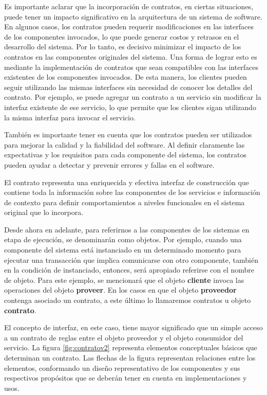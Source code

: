 Es importante aclarar que la incorporación de contratos, en ciertas situaciones, puede tener un impacto significativo en la arquitectura de un sistema de software. En algunos casos, los contratos pueden requerir modificaciones en las interfaces de los componentes invocados, lo que puede generar costos y retrasos en el desarrollo del sistema. Por lo tanto, es decisivo minimizar el impacto de los contratos en las componentes originales del sistema. Una forma de lograr esto es mediante la implementación de contratos que sean compatibles con las interfaces existentes de los componentes invocados. De esta manera, los clientes pueden seguir utilizando las mismas interfaces sin necesidad de conocer los detalles del contrato. Por ejemplo, se puede agregar un contrato a un servicio sin modificar la interfaz existente de ese servicio, lo que permite que los clientes sigan utilizando la misma interfaz para invocar el servicio.

También es importante tener en cuenta que los contratos pueden ser utilizados para mejorar la calidad y la fiabilidad del software. Al definir claramente las expectativas y los requisitos para cada componente del sistema, los contratos pueden ayudar a detectar y prevenir errores y fallas en el software.

El contrato representa una enriquecida y efectiva interfaz de construcción que contiene toda la información sobre las componentes de los servicios e información de contexto para definir comportamientos a niveles funcionales en el sistema original que lo incorpora.

Desde ahora en adelante, para referirnos a las componentes de los sistemas en etapa de ejecución, se denominarán como objetos. Por ejemplo, cuando una componente del sistema está instanciado en un determinado momento para ejecutar una transacción que implica comunicarse con otro componente, también en la condición de instanciado, entonces, será apropiado referirse con el nombre de objeto. Para este ejemplo, se mencionará que el objeto \textbf{cliente} invoca las operaciones del objeto \textbf{proveer}. En los casos en que el objeto \textbf{proveedor} contenga asociado un contrato, a este último lo llamaremos contratos u objeto \textbf{contrato}.


El concepto de interfaz, en este caso, tiene mayor significado que un simple acceso a un contrato de reglas entre el objeto proveedor y el objeto consumidor del servicio. La figura \ref{fig:contratov2} representa elementos conceptuales básicos que determinan un contrato. Las flechas de la figura representan relaciones entre los elementos, conformando un diseño representativo de los componentes y sus respectivos propósitos que se deberán tener en cuenta en implementaciones y usos. 

